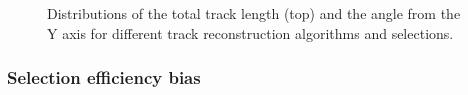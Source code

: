 \documentclass[12pt]{article}
\begin{document}
\begin{figure}
\centering
{}


\caption{Distributions of the total track length (top) and the angle from the Y axis for different track reconstruction algorithms and selections.}
\label{figTrackAndCutComparison}
\end{figure}

\subsubsection*{Selection efficiency bias}\label{secSelectionEfficiencyBias}
\end{document}
